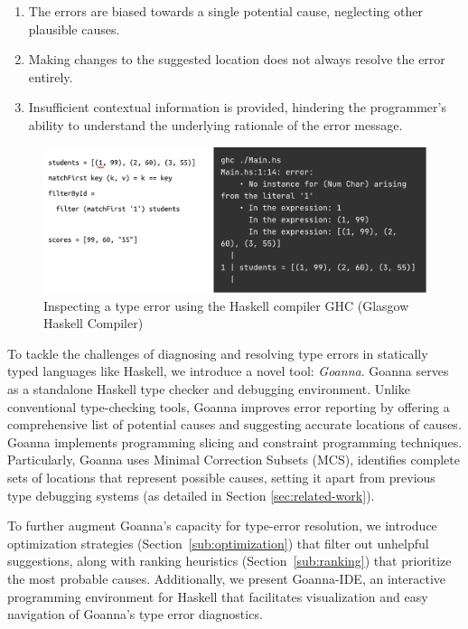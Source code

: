 \documentclass[pdflatex,sn-mathphys-num]{sn-jnl}%
\begin{document}
\begin{enumerate}
    \item The errors are biased towards a single potential cause, neglecting other plausible causes.
    \item Making changes to the suggested location does not always resolve the error entirely.
    \item Insufficient contextual information is provided, hindering the programmer's ability to understand the underlying rationale of the error message.
\end{enumerate}


\begin{figure}[ht!]
    \centering
    \includegraphics[width=\linewidth]{images/motivation}
    \caption{Inspecting a type error using the Haskell compiler GHC (Glasgow Haskell Compiler)}
    \label{fig:motivation}
\end{figure}

To tackle the challenges of diagnosing and resolving type errors in statically typed languages like Haskell, we introduce a novel tool: \textit{Goanna}. Goanna serves as a standalone Haskell type checker and debugging environment. Unlike conventional type-checking tools, Goanna improves error reporting by offering a comprehensive list of potential causes and suggesting accurate locations of causes. Goanna implements programming slicing and constraint programming techniques. Particularly, Goanna uses  Minimal Correction Subsets (MCS), identifies complete sets of locations that represent possible causes, setting it apart from previous type debugging systems (as detailed in Section \ref{sec:related-work}).

To further augment Goanna's capacity for type-error resolution, we introduce optimization strategies (Section~\ref{sub:optimization}) that filter out unhelpful suggestions, along with ranking heuristics (Section~\ref{sub:ranking}) that prioritize the most probable causes. Additionally, we present Goanna-IDE, an interactive programming environment for Haskell that facilitates visualization and easy navigation of Goanna's type error diagnostics.
\end{document}
